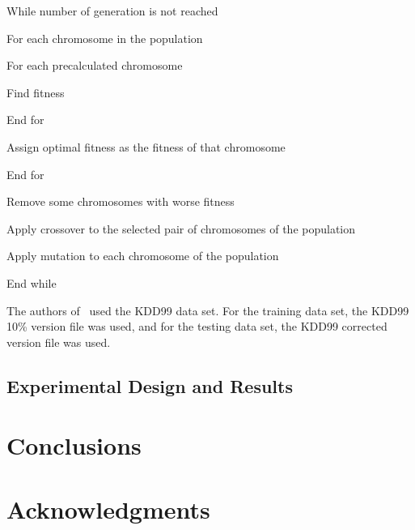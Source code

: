 \documentclass{sig-alternate}
\begin{document}
While number of generation is not reached
   
   For each chromosome in the population
      
      For each precalculated chromosome
         
         Find fitness
      
      End for

      Assign optimal fitness as the fitness of that chromosome
   
   End for
   
   Remove some chromosomes with worse fitness
   
   Apply crossover to the selected pair of chromosomes of the population

   Apply mutation to each chromosome of the population

End while 


The authors of~\cite{DBLP:journals/corr/abs-1204-1336} used the KDD99 data set. For the training data set, the KDD99 10\% version file was used, and for the testing data set, the KDD99 corrected version file was used. 




\subsection{Experimental Design and Results}





\section{Conclusions}





\section{Acknowledgments}





  
\end{document}
